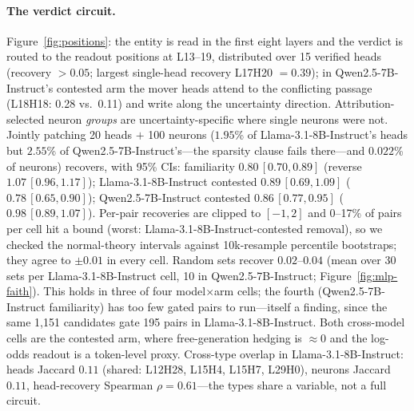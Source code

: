 \documentclass{article}
\newcommand{\lm}{Llama-3.1-8B-Instruct}
\newcommand{\qw}{Qwen2.5-7B-Instruct}
\begin{document}
\paragraph{The verdict circuit.}
Figure~\ref{fig:positions}: the entity is read in the first eight layers and the verdict is routed to the
readout positions at L13--19, distributed over 15 verified heads (recovery $>0.05$; largest single-head
recovery L17H20 $=0.39$); in \qw{}'s contested arm the mover heads attend to the conflicting passage (L18H18: 0.28
vs.\ 0.11) and write along the uncertainty direction. Attribution-selected neuron \emph{groups} are
uncertainty-specific where single neurons were not. Jointly patching 20 heads $+$ 100 neurons ($1.95$\% of \lm{}'s heads but $2.55$\% of \qw{}'s---the
sparsity clause fails there---and $0.022$\% of neurons) recovers, with 95\% CIs: familiarity
$0.80\,[0.70, 0.89]$ (reverse $1.07\,[0.96,1.17]$); \lm{} contested $0.89\,[0.69, 1.09]$
($0.78\,[0.65,0.90]$); \qw{} contested $0.86\,[0.77, 0.95]$ ($0.98\,[0.89,1.07]$). Per-pair recoveries
are clipped to $[-1,2]$ and 0--17\% of pairs per cell hit a bound (worst: \lm{}-contested removal), so we
checked the normal-theory intervals against 10k-resample percentile bootstraps; they agree to
$\pm 0.01$ in every cell. Random sets recover $0.02$--$0.04$ (mean over 30 sets per \lm{} cell, 10 in
\qw{}; Figure~\ref{fig:mlp-faith}). This holds in three of four model$\times$arm cells; the fourth (\qw{}
familiarity) has too few gated pairs to run---itself a finding, since the same 1{,}151 candidates gate 195
pairs in \lm{}. Both cross-model cells are the contested arm, where free-generation hedging is $\approx$0
and the log-odds readout is a token-level proxy. Cross-type overlap in \lm{}: heads Jaccard $0.11$ (shared:
L12H28, L15H4, L15H7, L29H0), neurons Jaccard $0.11$, head-recovery Spearman $\rho{=}0.61$---the types
share a variable, not a full circuit.
\end{document}
